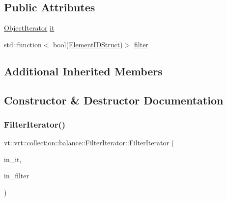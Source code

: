 \subsection*{Public Attributes}
\begin{DoxyCompactItemize}
\item 
\hyperlink{structvt_1_1vrt_1_1collection_1_1balance_1_1_object_iterator}{Object\+Iterator} \hyperlink{structvt_1_1vrt_1_1collection_1_1balance_1_1_filter_iterator_a908bc73f57f49c2f615119ac87b253a8}{it}
\item 
std\+::function$<$ bool(\hyperlink{structvt_1_1vrt_1_1collection_1_1balance_1_1_element_i_d_struct}{Element\+I\+D\+Struct})$>$ \hyperlink{structvt_1_1vrt_1_1collection_1_1balance_1_1_filter_iterator_a89d9841e7176310ab6c712643f88ead7}{filter}
\end{DoxyCompactItemize}
\subsection*{Additional Inherited Members}


\subsection{Constructor \& Destructor Documentation}
\mbox{\label{structvt_1_1vrt_1_1collection_1_1balance_1_1_filter_iterator_a42adc2e7e360cfe536246aec10814296}} 
\subsubsection{\texorpdfstring{Filter\+Iterator()}{FilterIterator()}}
{\footnotesize\ttfamily vt\+::vrt\+::collection\+::balance\+::\+Filter\+Iterator\+::\+Filter\+Iterator (\begin{DoxyParamCaption}\item[{\hyperlink{structvt_1_1vrt_1_1collection_1_1balance_1_1_object_iterator}{Object\+Iterator} \&\&}]{in\+\_\+it,  }\item[{std\+::function$<$ bool(\hyperlink{structvt_1_1vrt_1_1collection_1_1balance_1_1_element_i_d_struct}{Element\+I\+D\+Struct})$>$ \&\&}]{in\+\_\+filter }\end{DoxyParamCaption})\hspace{0.3cm}{\ttfamily [inline]}}



